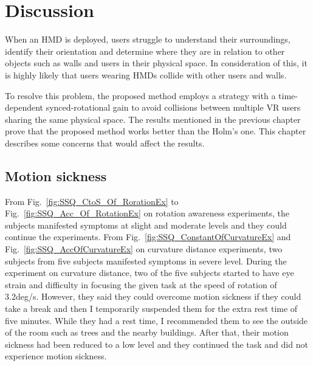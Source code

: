 \chapter{Discussion} %

\label{Chapter5} %


When an HMD is deployed, users struggle to understand their surroundings, identify their orientation and determine where they are in relation to other objects such as walls and users in their physical space. 
In consideration of this, it is highly likely that users wearing HMDs collide with other users and walls. 

To resolve this problem, the proposed method employs a strategy with a time-dependent synced-rotational gain to avoid collisions between multiple VR users sharing the same physical space. The results mentioned in the previous chapter prove that the proposed method works better than the Holm's one. This chapter describes some concerns that would affect the results. 
\section{Motion sickness}
From Fig.~\ref{fig:SSQ_CtoS_Of_RorationEx} to Fig.~\ref{fig:SSQ_Acc_Of_RotationEx} on rotation awareness experiments, the subjects manifested symptoms at slight and moderate levels and they could continue the experiments.
From Fig.~\ref{fig:SSQ_ConstantOfCurvatureEx} and Fig.~\ref{fig:SSQ_AccOfCurvatureEx} on curvature distance experiments, two subjects from five subjects manifested symptoms in severe level. During the experiment on curvature distance, two of the five subjects started to have eye strain and difficulty in focusing the given task at the speed of rotation of 3.2deg/s. However, they said they could overcome motion sickness if they could take a break and then I temporarily suspended them for the extra rest time of five minutes. While they had a rest time, I recommended them to see the outside of the room such as trees and the nearby buildings. After that, their motion sickness had been reduced to a low level and they continued the task and did not experience motion sickness.

